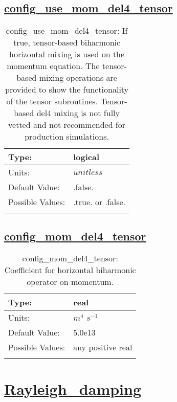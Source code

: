 \subsection[config\_use\_mom\_del4\_tensor]{\hyperref[sec:nm_tab_hmix_del4_tensor]{config\_use\_mom\_del4\_tensor}}
\label{subsec:nm_sec_config_use_mom_del4_tensor}
\begin{center}
\begin{longtable}{| p{2.0in} | p{4.0in} |}
    \hline
    Type: & logical \\
    \hline
    Units: & $unitless$ \\
    \hline
    Default Value: & .false. \\
    \hline
    Possible Values: & .true. or .false. \\
    \hline
    \caption{config\_use\_mom\_del4\_tensor: If true, tensor-based biharmonic horizontal mixing is used on the momentum equation.  The tensor-based mixing operations are provided to show the functionality of the tensor subroutines.  Tensor-based del4 mixing is not fully vetted and not recommended for production simulations.}
\end{longtable}
\end{center}
\subsection[config\_mom\_del4\_tensor]{\hyperref[sec:nm_tab_hmix_del4_tensor]{config\_mom\_del4\_tensor}}
\label{subsec:nm_sec_config_mom_del4_tensor}
\begin{center}
\begin{longtable}{| p{2.0in} | p{4.0in} |}
    \hline
    Type: & real \\
    \hline
    Units: & $m^4$ $s^{-1}$ \\
    \hline
    Default Value: & 5.0e13 \\
    \hline
    Possible Values: & any positive real \\
    \hline
    \caption{config\_mom\_del4\_tensor: Coefficient for horizontal biharmonic operator on momentum.}
\end{longtable}
\end{center}
\section[Rayleigh\_damping]{\hyperref[sec:nm_tab_Rayleigh_damping]{Rayleigh\_damping}}
\label{sec:nm_sec_Rayleigh_damping}
